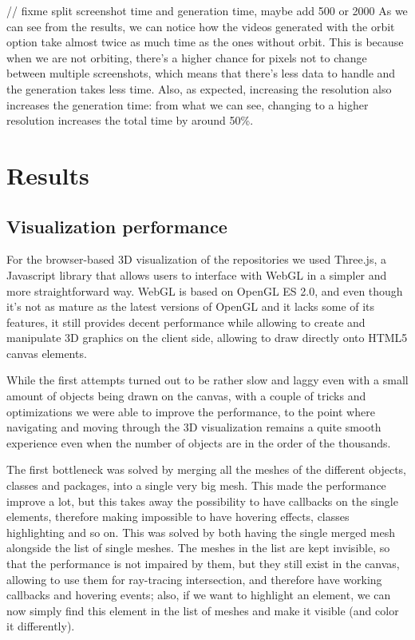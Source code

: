 \documentclass[]{usiinfbachelorproject}
\begin{document}
// fixme split screenshot time and generation time, maybe add 500 or 2000
As we can see from the results, we can notice how the videos generated with the orbit option take almost twice as much time
as the ones without orbit. This is because when we are not orbiting, there's a higher chance for pixels not to change between multiple screenshots, which means that there's less data to handle and the generation takes less time.
Also, as expected, increasing the resolution also increases the generation time: from what we can see, changing to a higher resolution increases the total time by around 50\%.






\section{Results} \label{Results}

\subsection{Visualization performance} \label{Visualization performance}

For the browser-based 3D visualization of the repositories we used Three.js, a Javascript library that allows users to interface with WebGL in a simpler and more straightforward way. WebGL is based on OpenGL ES 2.0, and even though it's not as mature as the latest versions of OpenGL and it lacks some of its features, it still provides decent performance while allowing to create and manipulate 3D graphics on the client side, allowing to draw directly onto HTML5 canvas elements.

While the first attempts turned out to be rather slow and laggy even with a small amount of objects being drawn on the canvas, with a couple of tricks and optimizations we were able to improve the performance, to the point where navigating and moving through the 3D visualization remains a quite smooth experience even when the number of objects are in the order of the thousands.

The first bottleneck was solved by merging all the meshes of the different objects, classes and packages, into a single very big mesh. This made the performance improve a lot, but this takes away the possibility to have callbacks on the single elements, therefore making impossible to have hovering effects, classes highlighting and so on. This was solved by both having the single merged mesh alongside the list of single meshes. The meshes in the list are kept invisible, so that the performance is not impaired by them, but they still exist in the canvas, allowing to use them for ray-tracing intersection, and therefore have working callbacks and hovering events; also, if we want to highlight an element, we can now simply find this element in the list of meshes and make it visible (and color it differently).
\end{document}
